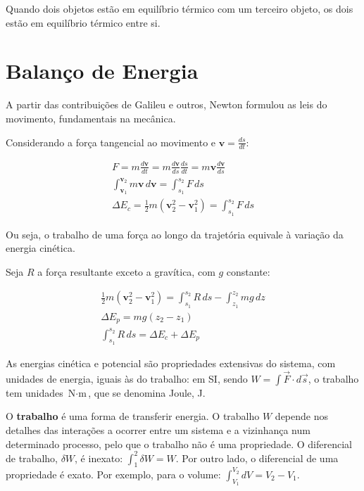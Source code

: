 
\begin{theorem}
    Quando dois objetos estão em equilíbrio térmico com um terceiro objeto, os dois estão em equilíbrio térmico entre si.
\end{theorem}

\section{Balanço de Energia}

A partir das contribuições de Galileu e outros, Newton formulou as leis do movimento, fundamentais na mecânica.

Considerando a força tangencial ao movimento e $\mathbf{v} = \frac{ds}{dt}$:

\begin{eqnarray*}
    F = m \frac{d\mathbf{v}}{dt} = m \frac{d\mathbf{v}}{ds} \frac{ds}{dt} = m \mathbf{v} \frac{d\mathbf{v}}{ds} \\
    \int_{\mathbf{v}_1}^{\mathbf{v}_2} m \mathbf{v} \, d\mathbf{v} = \int_{s_1}^{s_2} F \, ds \\
    \Delta E_c = \frac{1}{2} m \left( \mathbf{v}_2^2 - \mathbf{v}_1^2 \right) = \int_{s_1}^{s_2} F \, ds
\end{eqnarray*}

Ou seja, o trabalho de uma força ao longo da trajetória equivale à variação da energia cinética.

Seja $R$ a força resultante exceto a gravítica, com $g$ constante:

\begin{eqnarray*}
    \frac{1}{2} m \left( \mathbf{v}_2^2 - \mathbf{v}_1^2 \right) = \int_{s_1}^{s_2} R \, ds - \int_{z_1}^{z_2} mg \, dz \\
    \Delta E_p = mg(z_2 - z_1) \\
    \int_{s_1}^{s_2} R \, ds = \Delta E_c + \Delta E_p
\end{eqnarray*}

As energias cinética e potencial são propriedades extensivas do sistema, com unidades de energia, iguais às do trabalho: em SI, sendo $W = \int \vec{F} \cdot d\vec{s}$, o trabalho tem unidades $\text{N} \cdot \text{m}$, que se denomina Joule, J.

O \textbf{trabalho} é uma forma de transferir energia. O trabalho $W$ depende nos detalhes das interações a ocorrer entre um sistema e a vizinhança num determinado processo, pelo que o trabalho não é uma propriedade. O diferencial de trabalho, $\delta W$, é inexato: $\int_1^2 \delta W = W$. Por outro lado, o diferencial de uma propriedade é exato. Por exemplo, para o volume: $\int_{V_1}^{V_2} dV = V_2 - V_1$.

